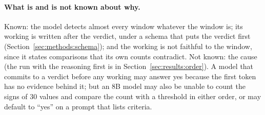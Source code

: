 \paragraph{What is and is not known about why.}
Known: the model detects almost every window whatever the window is; its working is written after the verdict, under a schema that puts the verdict first (Section~\ref{sec:methods:schema}); and the working is not faithful to the window, since it states comparisons that its own counts contradict. Not known: the cause (the run with the reasoning first is in Section~\ref{sec:results:order}). A model that commits to a verdict before any working may answer yes because the first token has no evidence behind it; but an 8B model may also be unable to count the signs of 30 values and compare the count with a threshold in either order, or may default to ``yes'' on a prompt that lists criteria.

